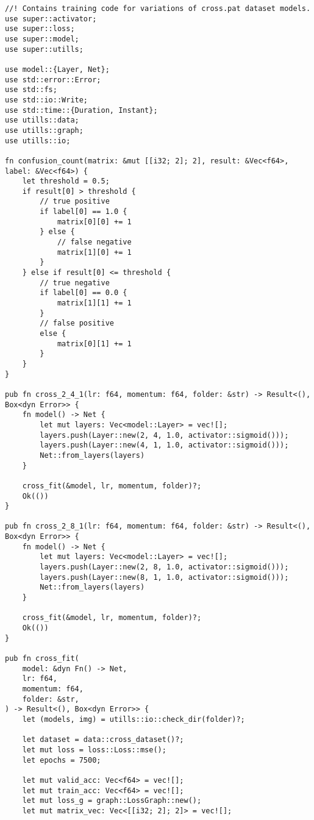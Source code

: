 \begin{verbatim}
//! Contains training code for variations of cross.pat dataset models.
use super::activator;
use super::loss;
use super::model;
use super::utills;

use model::{Layer, Net};
use std::error::Error;
use std::fs;
use std::io::Write;
use std::time::{Duration, Instant};
use utills::data;
use utills::graph;
use utills::io;

fn confusion_count(matrix: &mut [[i32; 2]; 2], result: &Vec<f64>, label: &Vec<f64>) {
    let threshold = 0.5;
    if result[0] > threshold {
        // true positive
        if label[0] == 1.0 {
            matrix[0][0] += 1
        } else {
            // false negative
            matrix[1][0] += 1
        }
    } else if result[0] <= threshold {
        // true negative
        if label[0] == 0.0 {
            matrix[1][1] += 1
        }
        // false positive
        else {
            matrix[0][1] += 1
        }
    }
}

pub fn cross_2_4_1(lr: f64, momentum: f64, folder: &str) -> Result<(), Box<dyn Error>> {
    fn model() -> Net {
        let mut layers: Vec<model::Layer> = vec![];
        layers.push(Layer::new(2, 4, 1.0, activator::sigmoid()));
        layers.push(Layer::new(4, 1, 1.0, activator::sigmoid()));
        Net::from_layers(layers)
    }

    cross_fit(&model, lr, momentum, folder)?;
    Ok(())
}

pub fn cross_2_8_1(lr: f64, momentum: f64, folder: &str) -> Result<(), Box<dyn Error>> {
    fn model() -> Net {
        let mut layers: Vec<model::Layer> = vec![];
        layers.push(Layer::new(2, 8, 1.0, activator::sigmoid()));
        layers.push(Layer::new(8, 1, 1.0, activator::sigmoid()));
        Net::from_layers(layers)
    }

    cross_fit(&model, lr, momentum, folder)?;
    Ok(())
}

pub fn cross_fit(
    model: &dyn Fn() -> Net,
    lr: f64,
    momentum: f64,
    folder: &str,
) -> Result<(), Box<dyn Error>> {
    let (models, img) = utills::io::check_dir(folder)?;

    let dataset = data::cross_dataset()?;
    let mut loss = loss::Loss::mse();
    let epochs = 7500;

    let mut valid_acc: Vec<f64> = vec![];
    let mut train_acc: Vec<f64> = vec![];
    let mut loss_g = graph::LossGraph::new();
    let mut matrix_vec: Vec<[[i32; 2]; 2]> = vec![];


\end{verbatim}
